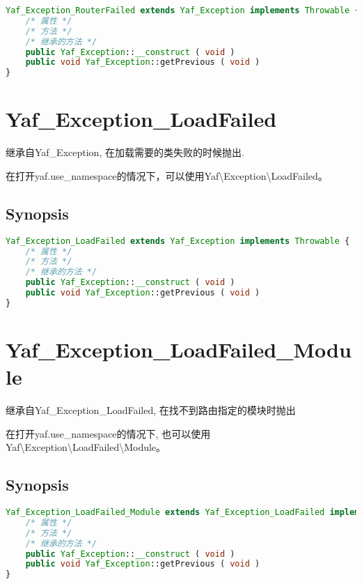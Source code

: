 \begin{lstlisting}[language=PHP]
Yaf_Exception_RouterFailed extends Yaf_Exception implements Throwable {
    /* 属性 */
    /* 方法 */
    /* 继承的方法 */
    public Yaf_Exception::__construct ( void )
    public void Yaf_Exception::getPrevious ( void )
}
\end{lstlisting}

\chapter{Yaf\_Exception\_LoadFailed}

继承自Yaf\_Exception, 在加载需要的类失败的时候抛出.

在打开yaf.use\_namespace的情况下，可以使用Yaf\textbackslash Exception\textbackslash LoadFailed。

\section{Synopsis}


\begin{lstlisting}[language=PHP]
Yaf_Exception_LoadFailed extends Yaf_Exception implements Throwable {
    /* 属性 */
    /* 方法 */
    /* 继承的方法 */
    public Yaf_Exception::__construct ( void )
    public void Yaf_Exception::getPrevious ( void )
}
\end{lstlisting}

\chapter{Yaf\_Exception\_LoadFailed\_Module}

继承自Yaf\_Exception\_LoadFailed, 在找不到路由指定的模块时抛出

在打开yaf.use\_namespace的情况下, 也可以使用 Yaf\textbackslash Exception\textbackslash LoadFailed\textbackslash Module。


\section{Synopsis}


\begin{lstlisting}[language=PHP]
Yaf_Exception_LoadFailed_Module extends Yaf_Exception_LoadFailed implements Throwable {
    /* 属性 */
    /* 方法 */
    /* 继承的方法 */
    public Yaf_Exception::__construct ( void )
    public void Yaf_Exception::getPrevious ( void )
}
\end{lstlisting}

